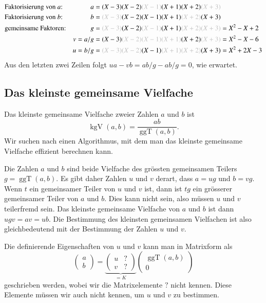 \begin{beispiel}
\begin{align*}
&\text{Faktorisierung von $a$:}&
a    &=      (X-3)      (X-2)\grau{(X-1)}     (X+1)       (X+2) \grau{(X+3)}\\
&\text{Faktorisierung von $b$:}&
b    &=\grau{(X-3)}     (X-2)      (X-1)      (X+1) \grau{(X+2)}      (X+3) \\
&\text{gemeinsame Faktoren:}&
g    &=\grau{(X-3)}     (X-2)\grau{(X-1)}     (X+1) \grau{(X+2)}\grau{(X+3)}
    = X^2 -X + 2\\
&&
v=a/g  &=    (X-3)\grau{(X-2)      (X-1)      (X+1)}      (X+2) \grau{(X+3)}
    = X^2-X-6 \\
&&
u=b/g&=\grau{(X-3)      (X-2)}     (X-1)\grau{(X+1)       (X+2)}      (X+3)
    = X^2+2X-3
\end{align*}
Aus den letzten zwei Zeilen folgt
$ua-vb = ab/g - ab/g = 0$, wie erwartet.
\end{beispiel}

%
%
\subsection{Das kleinste gemeinsame Vielfache
\label{buch:subsection:daskgv}}
%
%
Das kleinste gemeinsame Vielfache zweier Zahlen $a$ und $b$ ist
\[
\operatorname{kgV}(a,b)
=
\frac{ab}{\operatorname{ggT}(a,b)}.
\]
Wir suchen nach einen Algorithmus, mit dem man das kleinste gemeinsame
Vielfache effizient berechnen kann.

Die Zahlen $a$ und $b$ sind beide Vielfache des grössten gemeinsamen
Teilers $g=\operatorname{ggT}(a,b)$.
Es gibt daher Zahlen $u$ und $v$ derart, dass $a=ug$ und $b=vg$.
Wenn $t$ ein gemeinsamer Teiler von $u$ und $v$ ist, dann ist $tg$ ein
grösserer gemeinsamer Teiler von $a$ und $b$.
Dies kann nicht sein, also müssen $u$ und $v$ teilerfremd sein.
Das kleinste gemeinsame Vielfache von $a$ und $b$ ist dann $ugv=av=ub$.
Die Bestimmung des kleinsten gemeinsamen Vielfachen ist also gleichbedeutend
mit der Bestimmung der Zahlen $u$ und $v$.

Die definierende Eigenschaften von $u$ und $v$ kann man in Matrixform als
%
\begin{equation}
\begin{pmatrix}
a\\b
\end{pmatrix}
=
\underbrace{
\begin{pmatrix}
u&?\\
v&?
\end{pmatrix}}_{\displaystyle =K}
\begin{pmatrix}
\operatorname{ggT}(a,b)\\ 0
\end{pmatrix}
\label{buch:eindlichekoerper:eqn:uvmatrix}
\end{equation}
geschrieben werden, wobei wir die Matrixelemente $?$ nicht kennen.
Diese Elemente müssen wir auch nicht kennen, um $u$ und $v$ zu bestimmen.

